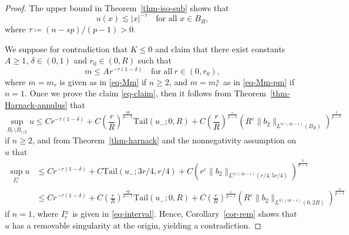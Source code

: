 \documentclass[11pt]{amsart}
\theoremstyle{plain}
\theoremstyle{definition}
\numberwithin{equation}{section}
\begin{document}
\begin{proof}
The upper bound in Theorem~\ref{thm-iso-sub} shows that
\begin{equation}\label{eq-upper}
u(x) \lesssim |x|^{-\tau} \quad\text{for all }x \in B_{R},
\end{equation}
where $\tau\coloneqq (n-sp)/(p-1)>0$. 

We suppose for contradiction that $K \leq 0$ and claim that there exist constants $A \geq 1$, $\delta \in (0,1)$ and $r_0 \in (0, R)$ such that
	\begin{equation}\label{eq-claim}
		m \leq A r^{-\tau(1-\delta)} \quad\text{for all}~r\in (0, r_0),
	\end{equation}
where $m=m_r$ is given as in \eqref{eq-Mm} if $n\geq 2$, and $m=m_r^\pm$ as in \eqref{eq-Mm-pm} if $n=1$.
Once we prove the claim \eqref{eq-claim}, then it follows from Theorem~\ref{thm-Harnack-annulus} that
 \begin{equation*}
\sup_{B_r \setminus B_{r/2}}{u} \leq C r^{-\tau(1-\delta)} + C \left(\frac{r}{R}\right)^{\frac{sp}{p-1}}\mathrm{Tail}(u_-; 0, R) + C\left(\frac{r}{R}\right)^{\frac{\varepsilon}{p-1}}\left( R^\varepsilon \|b_2\|_{L^{n/(sp-\varepsilon)}(B_R)} \right)^{\frac{1}{p-1}}
\end{equation*}
if $n\geq 2$, and from Theorem~\ref{thm-harnack} and the nonnegativity assumption on $u$ that
\begin{align*}
\sup_{I_r^\pm}{u}
&\leq C r^{-\tau(1-\delta)} + C \mathrm{Tail}(u_-; 3r/4, r/4) + C \left( r^\varepsilon \|b_2\|_{L^{n/(sp-\varepsilon)}(r/4, 5r/4)} \right)^{\frac{1}{p-1}} \\
&\leq C r^{-\tau(1-\delta)} + C \left( \frac{r}{R} \right)^{\frac{sp}{p-1}} \mathrm{Tail}(u_-; 0, R) + C \left( \frac{r}{R} \right)^{\frac{\varepsilon}{p-1}} \left( R^\varepsilon \|b_2\|_{L^{n/(sp-\varepsilon)}(0, 2R)} \right)^{\frac{1}{p-1}}
\end{align*}
if $n=1$, where $I_r^\pm$ is given in \eqref{eq-interval}.
	Hence, Corollary~\ref{cor-rem} shows that $u$ has a removable singularity at the origin, yielding a contradiction.


\end{proof}
\end{document}
